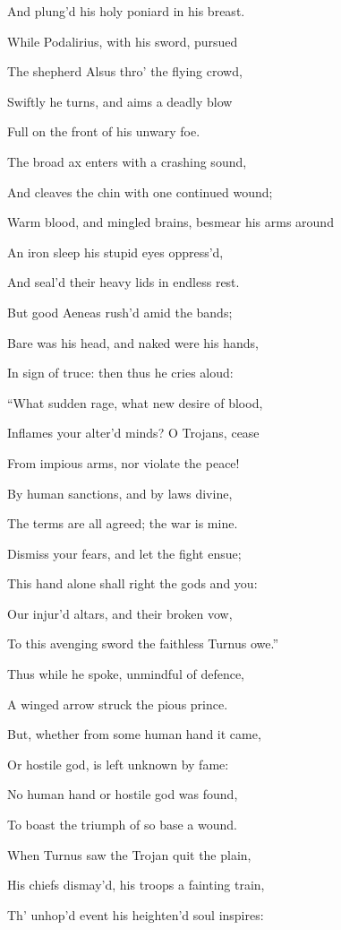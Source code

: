 And plung’d his holy poniard in his breast.

While Podalirius, with his sword, pursued

The shepherd Alsus thro’ the flying crowd,

Swiftly he turns, and aims a deadly blow

Full on the front of his unwary foe.

The broad ax enters with a crashing sound,

And cleaves the chin with one continued wound;

Warm blood, and mingled brains, besmear his arms around

An iron sleep his stupid eyes oppress’d,

And seal’d their heavy lids in endless rest.

But good Aeneas rush’d amid the bands;

Bare was his head, and naked were his hands,

In sign of truce: then thus he cries aloud:

“What sudden rage, what new desire of blood,

Inflames your alter’d minds? O Trojans, cease

From impious arms, nor violate the peace!

By human sanctions, and by laws divine,

The terms are all agreed; the war is mine.

Dismiss your fears, and let the fight ensue;

This hand alone shall right the gods and you:

Our injur’d altars, and their broken vow,

To this avenging sword the faithless Turnus owe.”

Thus while he spoke, unmindful of defence,

A winged arrow struck the pious prince.

But, whether from some human hand it came,

Or hostile god, is left unknown by fame:

No human hand or hostile god was found,

To boast the triumph of so base a wound.

When Turnus saw the Trojan quit the plain,

His chiefs dismay’d, his troops a fainting train,

Th’ unhop’d event his heighten’d soul inspires:

